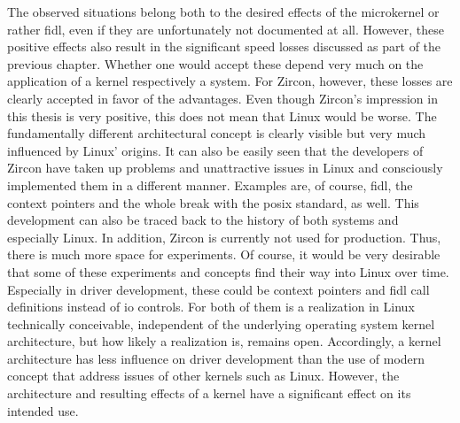 The observed situations belong both to the desired effects of the microkernel or rather \ac{fidl}, even if they are unfortunately not documented at all.
However, these positive effects also result in the significant speed losses discussed as part of the previous chapter.
Whether one would accept these depend very much on the application of a kernel respectively a system.
For Zircon, however, these losses are clearly accepted in favor of the advantages.
Even though Zircon's impression in this thesis is very positive, this does not mean that Linux would be worse.
The fundamentally different architectural concept is clearly visible but very much influenced by Linux' origins.
It can also be easily seen that the developers of Zircon have taken up problems and unattractive issues in Linux and consciously implemented them in a different manner.
Examples are, of course, \ac{fidl}, the context pointers and the whole break with the \ac{posix} standard, as well.
This development can also be traced back to the history of both systems and especially Linux.
In addition, Zircon is currently not used for production.
Thus, there is much more space for experiments.
Of course, it would be very desirable that some of these experiments and concepts find their way into Linux over time.
Especially in driver development, these could be context pointers and \ac{fidl} call definitions instead of \ac{io} controls.
For both of them is a realization in Linux technically conceivable, independent of the underlying operating system kernel architecture, but how likely a realization is, remains open.
Accordingly, a kernel architecture has less influence on driver development than the use of modern concept that address issues of other kernels such as Linux.
However, the architecture and resulting effects of a kernel have a significant effect on its intended use.





